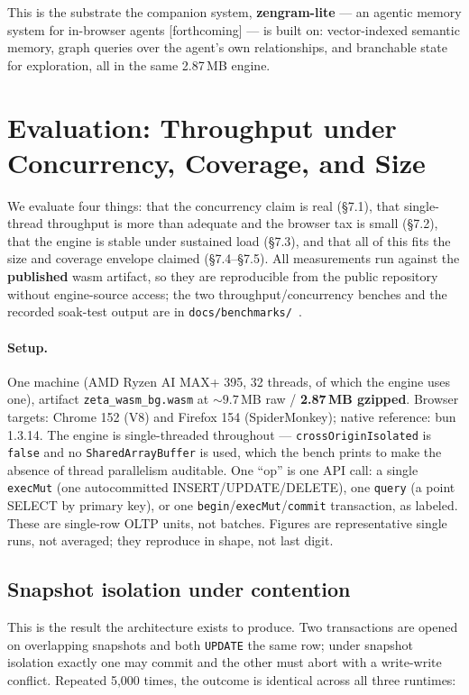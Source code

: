 \documentclass[11pt]{article}
\begin{document}
This is the substrate the companion system, \textbf{zengram-lite} --- an agentic
memory system for in-browser agents [forthcoming] --- is built on: vector-indexed
semantic memory, graph queries over the agent's own relationships, and branchable
state for exploration, all in the same 2.87\,MB engine.

\section{Evaluation: Throughput under Concurrency, Coverage, and Size}

We evaluate four things: that the concurrency claim is real (\S7.1), that
single-thread throughput is more than adequate and the browser tax is small
(\S7.2), that the engine is stable under sustained load (\S7.3), and that all of
this fits the size and coverage envelope claimed (\S7.4--\S7.5). All measurements
run against the \textbf{published} wasm artifact, so they are reproducible from the
public repository without engine-source access; the two throughput/concurrency
benches and the recorded soak-test output are in
\texttt{docs/benchmarks/}~\cite{artifacts}.

\paragraph{Setup.}
One machine (AMD Ryzen AI MAX+ 395, 32 threads, of which the engine uses one),
artifact \texttt{zeta\_wasm\_bg.wasm} at ${\sim}9.7$\,MB raw / \textbf{2.87\,MB
gzipped}. Browser targets: Chrome 152 (V8) and Firefox 154 (SpiderMonkey); native
reference: bun 1.3.14. The engine is single-threaded throughout ---
\texttt{crossOriginIsolated} is \texttt{false} and no \texttt{SharedArrayBuffer} is
used, which the bench prints to make the absence of thread parallelism auditable.
One ``op'' is one API call: a single \texttt{execMut} (one autocommitted
INSERT/UPDATE/DELETE), one \texttt{query} (a point SELECT by primary key), or one
\texttt{begin}/\texttt{execMut}/\texttt{commit} transaction, as labeled. These are
single-row OLTP units, not batches. Figures are representative single runs, not
averaged; they reproduce in shape, not last digit.

\subsection{Snapshot isolation under contention}

This is the result the architecture exists to produce. Two transactions are opened
on overlapping snapshots and both \texttt{UPDATE} the same row; under snapshot
isolation exactly one may commit and the other must abort with a write-write
conflict. Repeated 5,000 times, the outcome is identical across all three runtimes:
\end{document}
